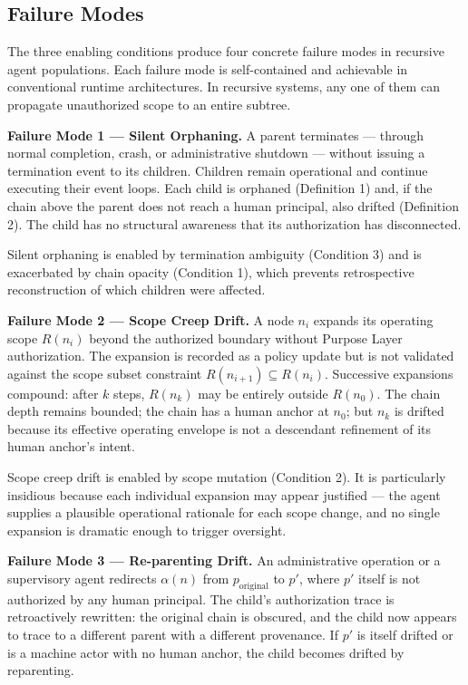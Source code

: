\subsection{Failure Modes}

The three enabling conditions produce four concrete failure modes in recursive agent populations. Each failure mode is self-contained and achievable in conventional runtime architectures. In recursive systems, any one of them can propagate unauthorized scope to an entire subtree.

\medskip
\noindent\textbf{Failure Mode 1 — Silent Orphaning.} A parent terminates — through normal completion, crash, or administrative shutdown — without issuing a termination event to its children. Children remain operational and continue executing their event loops. Each child is orphaned (Definition 1) and, if the chain above the parent does not reach a human principal, also drifted (Definition 2). The child has no structural awareness that its authorization has disconnected.

Silent orphaning is enabled by termination ambiguity (Condition 3) and is exacerbated by chain opacity (Condition 1), which prevents retrospective reconstruction of which children were affected.

\medskip
\noindent\textbf{Failure Mode 2 — Scope Creep Drift.} A node $n_i$ expands its operating scope $R(n_i)$ beyond the authorized boundary without Purpose Layer authorization. The expansion is recorded as a policy update but is not validated against the scope subset constraint $R(n_{i+1}) \subseteq R(n_i)$. Successive expansions compound: after $k$ steps, $R(n_k)$ may be entirely outside $R(n_0)$. The chain depth remains bounded; the chain has a human anchor at $n_0$; but $n_k$ is drifted because its effective operating envelope is not a descendant refinement of its human anchor's intent.

Scope creep drift is enabled by scope mutation (Condition 2). It is particularly insidious because each individual expansion may appear justified — the agent supplies a plausible operational rationale for each scope change, and no single expansion is dramatic enough to trigger oversight.

\medskip
\noindent\textbf{Failure Mode 3 — Re-parenting Drift.} An administrative operation or a supervisory agent redirects $\alpha(n)$ from $p_{\text{original}}$ to $p'$, where $p'$ itself is not authorized by any human principal. The child's authorization trace is retroactively rewritten: the original chain is obscured, and the child now appears to trace to a different parent with a different provenance. If $p'$ is itself drifted or is a machine actor with no human anchor, the child becomes drifted by reparenting.

